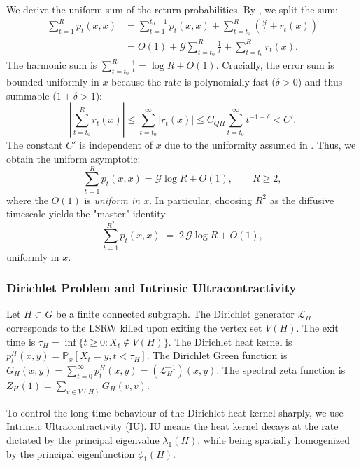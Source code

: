 \documentclass{article}
\numberwithin{equation}{section}
\theoremstyle{definition}
\theoremstyle{remark}
\newcommand{\cG}{\mathcal{G}}
\newcommand{\LL}{\mathcal{L}}
\newcommand{\Prob}{\mathbb{P}}
\begin{document}
We derive the uniform sum of the return probabilities. By , we split the sum:
\begin{align*}
\sum_{t=1}^{R} p_t(x,x) &= \sum_{t=1}^{t_0-1} p_t(x,x) + \sum_{t=t_0}^{R} \left(\frac{\cG}{t} + r_t(x)\right) \\
&= O(1) + \cG \sum_{t=t_0}^{R} \frac{1}{t} + \sum_{t=t_0}^{R} r_t(x).
\end{align*}
The harmonic sum is $\sum_{t=t_0}^{R} \frac{1}{t} = \log R + O(1)$.
Crucially, the error sum is bounded uniformly in $x$ because the rate is polynomially fast ($\delta>0$) and thus summable ($1+\delta > 1$):
\[
\left|\sum_{t=t_0}^{R} r_t(x)\right| \leq \sum_{t=t_0}^{\infty} |r_t(x)| \leq C_{QH} \sum_{t=t_0}^{\infty} t^{-1-\delta} < C'.
\]
The constant $C'$ is independent of $x$ due to the uniformity assumed in .
Thus, we obtain the uniform asymptotic:
\begin{equation}\label{eq:return-sum}
\sum_{t=1}^{R} p_t(x,x) = \cG \log R + O(1), \qquad R \geq 2,
\end{equation}
where the $O(1)$ is \emph{uniform in $x$}. In particular, choosing $R^2$ as the diffusive timescale yields the "master" identity
\begin{equation}\label{eq:master-sum}
  \sum_{t=1}^{R^{2}} p_t(x,x)
  \;=\; 2\,\cG \log R + O(1),
\end{equation}
uniformly in $x$.


\subsubsection{Dirichlet Problem and Intrinsic Ultracontractivity}
Let $H \subset G$ be a finite connected subgraph.
The Dirichlet generator $\LL_H$ corresponds to the LSRW killed upon exiting the vertex set $V(H)$. The exit time is $\tau_H = \inf\{t \geq 0 : X_t \notin V(H)\}$.
The Dirichlet heat kernel is $p_t^H(x,y) = \Prob_x[X_t = y, t < \tau_H]$. The Dirichlet Green function is $G_H(x,y) = \sum_{t=0}^{\infty} p_t^H(x,y) = (\LL_H^{-1})(x,y)$. The spectral zeta function is $Z_H(1) = \sum_{v \in V(H)} G_H(v,v)$.

To control the long-time behaviour of the Dirichlet heat kernel sharply, we use Intrinsic Ultracontractivity (IU). IU means the heat kernel decays at the rate dictated by the principal eigenvalue $\lambda_1(H)$, while being spatially homogenized by the principal eigenfunction $\phi_1(H)$.
\end{document}
